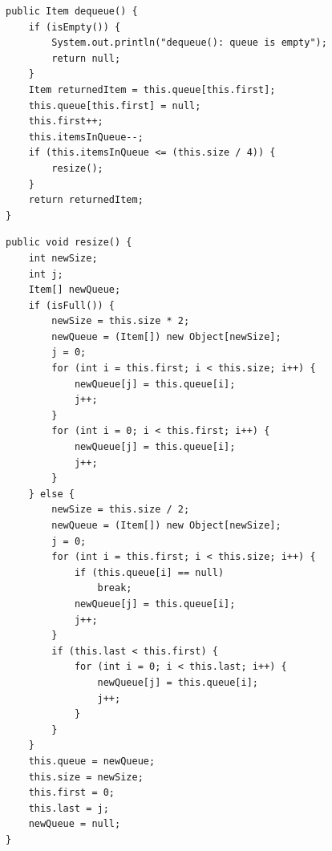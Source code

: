 \documentclass[a4paper,11pt]{article}
\newenvironment{code}{\captionsetup{type=listing}}{}
\begin{document}
\begin{code}
    \label{code:arrayDequeue}
    \begin{verbatim}
public Item dequeue() {
    if (isEmpty()) {
        System.out.println("dequeue(): queue is empty");
        return null;
    }
    Item returnedItem = this.queue[this.first];
    this.queue[this.first] = null;
    this.first++;
    this.itemsInQueue--;
    if (this.itemsInQueue <= (this.size / 4)) {
        resize();
    }
    return returnedItem;
}
\end{verbatim}
\end{code}

\begin{code}
    \label{code:resize}
    \begin{verbatim}
public void resize() {
    int newSize;
    int j;
    Item[] newQueue;
    if (isFull()) {
        newSize = this.size * 2;
        newQueue = (Item[]) new Object[newSize];
        j = 0;
        for (int i = this.first; i < this.size; i++) {
            newQueue[j] = this.queue[i];
            j++;
        }
        for (int i = 0; i < this.first; i++) {
            newQueue[j] = this.queue[i];
            j++;
        }
    } else {
        newSize = this.size / 2;
        newQueue = (Item[]) new Object[newSize];
        j = 0;
        for (int i = this.first; i < this.size; i++) {
            if (this.queue[i] == null)
                break;
            newQueue[j] = this.queue[i];
            j++;
        }
        if (this.last < this.first) {
            for (int i = 0; i < this.last; i++) {
                newQueue[j] = this.queue[i];
                j++;
            }
        }
    }
    this.queue = newQueue;
    this.size = newSize;
    this.first = 0;
    this.last = j;
    newQueue = null;
}
\end{verbatim}
\end{code}
\end{document}
